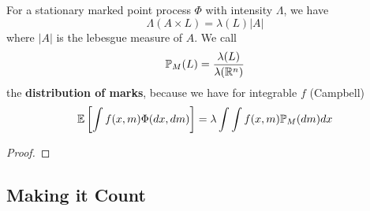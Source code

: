 \begin{lemma}[Campbell]
	For a stationary marked point process \(\Phi\) with intensity \(\Lambda\),
	we have	
	\[
		\Lambda(A \times L) = \lambda(L) |A|
	\]
	where \(|A|\) is the lebesgue measure of \(A\). We call
	\[
		\mathbb{P}_M(L) = \frac{\lambda(L)}{\lambda(\mathbb{R}^n)}
	\]
	the \textbf{distribution of marks}, because we have for integrable \(f\)
	(Campbell)
	\[
		\mathbb{E}\left[\int f(x,m) \Phi(dx,dm)\right]
		= \lambda \int \int f(x,m) \mathbb{P}_M(dm) dx
	\]
\end{lemma}
\begin{proof}
\end{proof}

\subsection{Making it Count}

